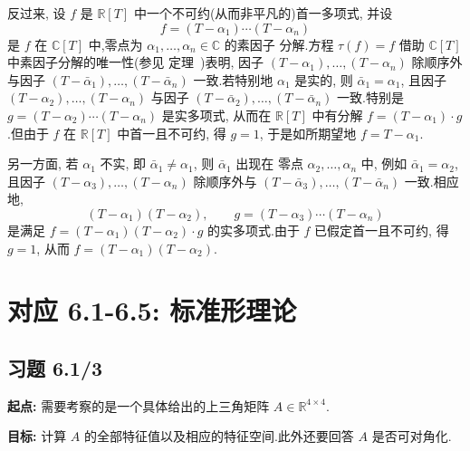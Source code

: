 反过来, 设 $f$ 是 $\mathbb{R}[T]$ 中一个不可约(从而非平凡的)首一多项式, 并设
\[
f = (T - \alpha_1) \cdots (T - \alpha_n)
\]
是 $f$ 在 $\mathbb{C}[T]$ 中,零点为 $\alpha_1, \ldots, \alpha_n \in \mathbb{C}$ 的素因子
分解.方程 $\tau(f) = f$ 借助 $\mathbb{C}[T]$ 中素因子分解的唯一性(参见
定理~)表明, 因子 $(T - \alpha_1), \ldots, (T - \alpha_n)$ 除顺序外与因子
$(T - \bar{\alpha}_1), \ldots, (T - \bar{\alpha}_n)$ 一致.若特别地 $\alpha_1$ 是实的, 则
$\bar{\alpha}_1 = \alpha_1$, 且因子 $(T - \alpha_2), \ldots, (T - \alpha_n)$ 与因子
$(T - \bar{\alpha}_2), \ldots, (T - \bar{\alpha}_n)$ 一致.特别是 $g = (T - \alpha_2)
\cdots (T - \alpha_n)$ 是实多项式, 从而在 $\mathbb{R}[T]$ 中有分解 $f = (T - \alpha_1)
\cdot g$.但由于 $f$ 在 $\mathbb{R}[T]$ 中首一且不可约, 得 $g = 1$, 于是如所期望地
$f = T - \alpha_1$.

另一方面, 若 $\alpha_1$ 不实, 即 $\bar{\alpha}_1 \neq \alpha_1$, 则 $\bar{\alpha}_1$ 出现在
零点 $\alpha_2, \ldots, \alpha_n$ 中, 例如 $\bar{\alpha}_1 = \alpha_2$, 且因子
$(T - \alpha_3), \ldots, (T - \alpha_n)$ 除顺序外与 $(T - \bar{\alpha}_3), \ldots,
(T - \bar{\alpha}_n)$ 一致.相应地,
\[
(T - \alpha_1)(T - \alpha_2), \qquad g = (T - \alpha_3) \cdots (T - \alpha_n)
\]
是满足 $f = (T - \alpha_1)(T - \alpha_2) \cdot g$ 的实多项式.由于 $f$ 已假定首一且不可约,
得 $g = 1$, 从而 $f = (T - \alpha_1)(T - \alpha_2)$.


\section*{对应 6.1-6.5: 标准形理论}

\subsection*{习题 6.1/3}

\noindent\textbf{起点:} 需要考察的是一个具体给出的上三角矩阵 $A \in \mathbb{R}^{4 \times 4}$.

\noindent\textbf{目标:} 计算 $A$ 的全部特征值以及相应的特征空间.此外还要回答 $A$ 是否可对角化.

